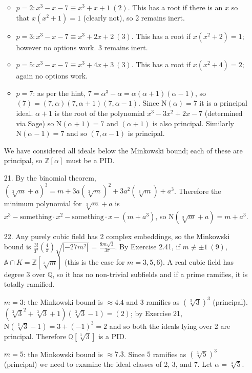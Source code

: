 \documentclass{article}
\newcommand{\Q}[0]{\mathbb{Q}}
\newcommand{\Z}[0]{\mathbb{Z}}
\newcommand{\norm}[0]{\text{N}}
\newcommand{\modequiv}[3]{#1 \equiv #2\ (#3)}
\newcommand{\modnotequiv}[3]{#1 \not\equiv #2\ (#3)}
\newcommand{\ringofintegers}[1]{\mathbb{A} \cap #1}
\begin{document}
\begin{enumerate}
    \begin{itemize}
        \item $p = 2: \modequiv{x^3 - x - 7}{x^3 + x + 1}{2}$.  This has a root if there is an $x$ so that $x(x^2 + 1) = 1$ (clearly not), so 2 remains inert.
        \item $p = 3: \modequiv{x^3 - x - 7}{x^3 + 2x + 2}{3}$.  This has a root if $x(x^2 + 2) = 1$; however no options work.  3 remains inert.
        \item $p = 5: \modequiv{x^3 - x - 7}{x^3 + 4x + 3}{3}$.  This has a root if $x(x^2 + 4) = 2$; again no options work.
        \item $p = 7$: as per the hint, $7 = \alpha^3 - \alpha = \alpha(\alpha + 1)(\alpha - 1)$, so $(7) = (7, \alpha)(7, \alpha + 1)(7, \alpha - 1)$.  Since $\norm(\alpha) = 7$ it is a principal ideal.  $\alpha + 1$ is the root of the polynomial $x^3 - 3x^2 + 2x - 7$ (determined via Sage) so $\norm(\alpha + 1) = 7$ and $(\alpha + 1)$ is also principal.  Similarly $\norm(\alpha - 1) = 7$ and so $(7, \alpha - 1)$ is principal.
    \end{itemize}

    We have considered all ideals below the Minkowski bound; each of these are principal, so $\Z[\alpha]$ must be a PID.

    \item [21.] By the binomial theorem, $(\sqrt[3]{m} + a)^3 = m + 3a(\sqrt[3]{m})^2 + 3a^2(\sqrt[3]{m}) + a^3$.  Therefore the minimum polynomial for $\sqrt[3]{m} + a$ is $x^3 - \text{something}\cdot x^2 - \text{something} \cdot x - (m + a^3)$, so $\norm(\sqrt[3]{m} + a) = m + a^3$.

    \item [22.] Any purely cubic field has 2 complex embeddings, so the Minkowski bound is $\frac{3!}{3^3}\left(\frac{4}{\pi}\right)\sqrt{|-27m^2|}$ = $\frac{8m\sqrt{3}}{3\pi}$.  By Exercise 2.41, if $\modnotequiv{m}{\pm 1}{9}$,  $\ringofintegers{K} = \Z[\sqrt[3]{m}]$ (this is the case for $m = 3, 5, 6$).  A real cubic field has degree 3 over $\Q$, so it has no non-trivial subfields and if a prime ramifies, it is totally ramified.

    $m = 3$: the Minkowski bound is $\approx 4.4$ and 3 ramifies as $(\sqrt[3]{3})^3$ (principal).  $(\sqrt[3]{3}^2 + \sqrt[3]{3} + 1)(\sqrt[3]{3} - 1) = (2)$; by Exercise 21, $\norm(\sqrt[3]{3} - 1) = 3 + (-1)^3 = 2$ and so both the ideals lying over 2 are principal.  Therefore $\Q[\sqrt[3]{3}]$ is a PID.

    $m = 5$: the Minkowski bound is $\approx 7.3$.  Since $5$ ramifies as $(\sqrt[3]{5})^3$ (principal) we need to examine the ideal classes of 2, 3, and 7.  Let $\alpha = \sqrt[3]{5}$.


\end{enumerate}
\end{document}
